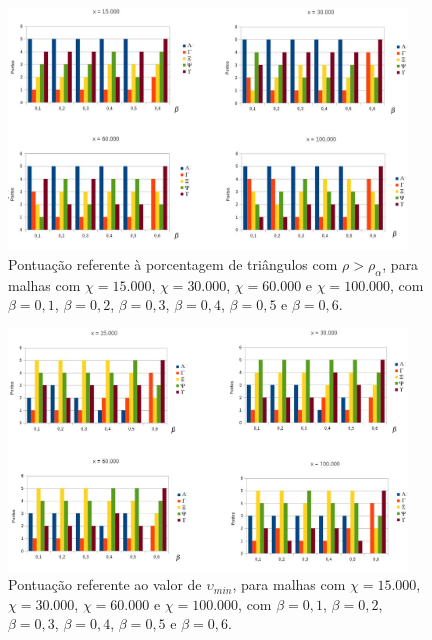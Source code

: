 \begin{figure}[!ht]
  \centering
  \includegraphics[width=300pt]{imagens_resultados/per_rho.png}
  \caption{\footnotesize{Pontuação referente à porcentagem de triângulos com $\rho > \rho_{\alpha}$, para malhas com $\chi = 15.000$, $\chi = 30.000$, $\chi = 60.000$ e $\chi = 100.000$, com $\beta = 0,1$, $\beta = 0,2$, $\beta = 0,3$, $\beta = 0,4$, $\beta = 0,5$ e $\beta = 0,6$.
   \label{grafico_per_rho}
}}
\end{figure}

\begin{figure}[!ht]
  \centering
  \includegraphics[width=300pt]{imagens_resultados/upsilon_min.png}
  \caption{\footnotesize{Pontuação referente ao valor de $\upsilon_{min}$, para malhas com $\chi = 15.000$, $\chi = 30.000$, $\chi = 60.000$ e $\chi = 100.000$, com $\beta = 0,1$, $\beta = 0,2$, $\beta = 0,3$, $\beta = 0,4$, $\beta = 0,5$ e $\beta = 0,6$.
   \label{grafico_upsilon_min}
}}
\end{figure}

